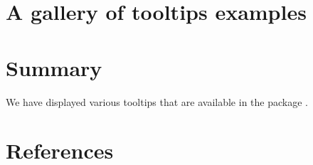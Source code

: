 \hypertarget{a-gallery-of-tooltips-examples}{%
\section{A gallery of tooltips examples}\label{a-gallery-of-tooltips-examples}}

\hypertarget{summary}{%
\section{Summary}\label{summary}}

We have displayed various tooltips that are available in the package .

\hypertarget{references}{%
\section*{References}\label{references}}

